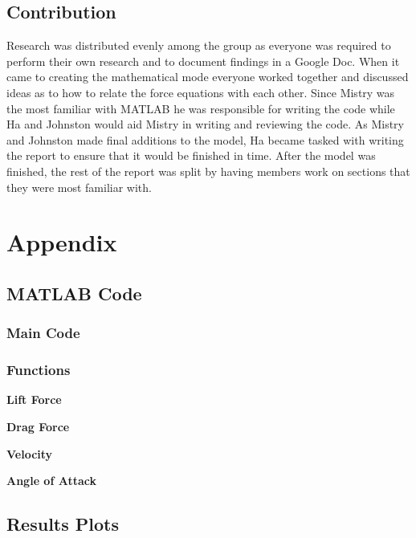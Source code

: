 \documentclass[12pt,twoside,letterpaper]{article}
\begin{document}
\begin{multicols}{2}
\section{Contribution}
Research was distributed evenly among the group as everyone was required to perform their own research and to document findings in a Google Doc. When it came to creating the mathematical mode everyone worked together and discussed ideas as to how to relate the force equations with each other. Since Mistry was the most familiar with MATLAB he was responsible for writing the code while Ha and Johnston would aid Mistry in writing and reviewing the code. As Mistry and Johnston made final additions to the model, Ha became tasked with writing the report to ensure that it would be finished in time. After the model was finished, the rest of the report was split by having members work on sections that they were most familiar with. 
\end{multicols}
\newpage


\newpage

\section{Appendix}
\subsection{MATLAB Code}\label{matlab}
\label{subsec::matlab code}
\subsubsection*{Main Code}
\label{subsubsec::main code}

\newpage

\subsubsection*{Functions}
\label{subsubsec::functions}
\textbf{Lift Force}

\textbf{Drag Force}

\textbf{Velocity}

\textbf{Angle of Attack}


\newpage

\subsection{Results Plots}
\label{subsec::result plots}
\end{document}

